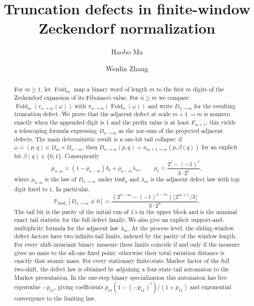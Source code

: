 \documentclass[11pt,reqno]{amsart}
\title[Truncation defects in finite-window Zeckendorf normalization]{Truncation defects in finite-window Zeckendorf normalization}
\author{Haobo Ma}
\author{Wenlin Zhang}
\date{}
\numberwithin{equation}{section}
\theoremstyle{plain}
\theoremstyle{definition}
\theoremstyle{remark}
\newcommand{\PP}{\mathbb{P}}
\newcommand{\Unif}{\mathsf{Unif}}
\DeclareMathOperator{\Fold}{Fold}
\begin{document}
\begin{abstract}
For $m\ge 1$, let $\Fold_m$ map a binary word of length $m$ to the first $m$
digits of the Zeckendorf expansion of its Fibonacci value.  For $n\ge m$ we
compare $\Fold_m(r_{n\to m}(\omega))$ with $\pi_{n\to m}(\Fold_n(\omega))$
and write $D_{n\to m}$ for the resulting truncation defect.  We prove that the
adjacent defect at scale $m+1\to m$ is nonzero exactly when the appended digit
is $1$ and the prefix value is at least $F_{m+1}$; this yields a telescoping
formula expressing $D_{n\to m}$ as the xor-sum of the projected adjacent
defects.  The main deterministic result is a one-bit tail collapse: if
$\omega=(p,q)\in\Omega_m\times\Omega_{n-m}$, then
$D_{n\to m}(p,q)=\kappa_{m+1\to m}(p,\beta(q))$ for an explicit bit
$\beta(q)\in\{0,1\}$.  Consequently
\[
\mu_{n,m}=(1-\rho_{n-m})\delta_0+\rho_{n-m}\lambda_m,
\qquad
\rho_\ell=\frac{2^\ell-(-1)^\ell}{3\cdot 2^\ell},
\]
where $\mu_{n,m}$ is the law of $D_{n\to m}$ under $\Unif_n$ and $\lambda_m$
is the adjacent defect law with top digit fixed to $1$.  In particular,
\[
\PP_{\Unif_n}[D_{n\to m}\ne 0]
=
\frac{(2^{n-m}-(-1)^{n-m})\lfloor 2^{m+1}/3\rfloor}{3\cdot 2^n}.
\]
The tail bit is the parity of the initial run of $1$'s in the upper block and
is the minimal exact tail statistic for the full defect family.  We also give
an explicit support-and-multiplicity formula for the adjacent law $\lambda_m$.
At the process level, the sliding-window defect factors have two
infinite-tail limits, indexed by the parity of the window length.  For every
shift-invariant binary measure these limits coincide if and only if the
measure gives no mass to the all-one fixed point; otherwise their total
variation distance is exactly that atomic mass.
For every stationary finite-state Markov factor of the full two-shift, the
defect law is obtained by adjoining a four-state tail automaton to the Markov
presentation.  In the one-step binary specialization this automaton has live
eigenvalue $-p_{11}$, giving coefficients
$p_{a1}(1-(-p_{11})^\ell)/(1+p_{11})$ and exponential convergence to the
limiting law.
\end{abstract}

\maketitle











\end{document}
